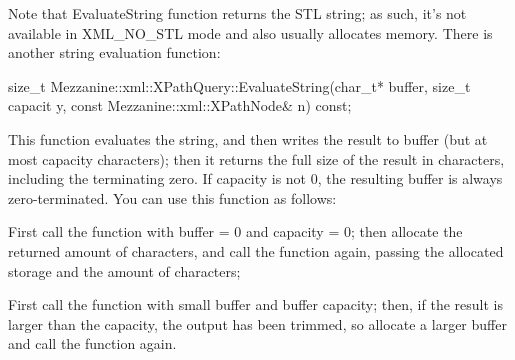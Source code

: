 Note that EvaluateString function returns the STL string; as such, it's not available in XML\_\-NO\_\-STL mode and also usually allocates memory. There is another string evaluation function: 
\begin{DoxyCode}
 size_t Mezzanine::xml::XPathQuery::EvaluateString(char_t* buffer, size_t capacit
      y, const Mezzanine::xml::XPathNode& n) const;
\end{DoxyCode}
 This function evaluates the string, and then writes the result to buffer (but at most capacity characters); then it returns the full size of the result in characters, including the terminating zero. If capacity is not 0, the resulting buffer is always zero-\/terminated. You can use this function as follows:
\begin{DoxyItemize}
\item First call the function with buffer = 0 and capacity = 0; then allocate the returned amount of characters, and call the function again, passing the allocated storage and the amount of characters;
\item First call the function with small buffer and buffer capacity; then, if the result is larger than the capacity, the output has been trimmed, so allocate a larger buffer and call the function again.
\end{DoxyItemize}

